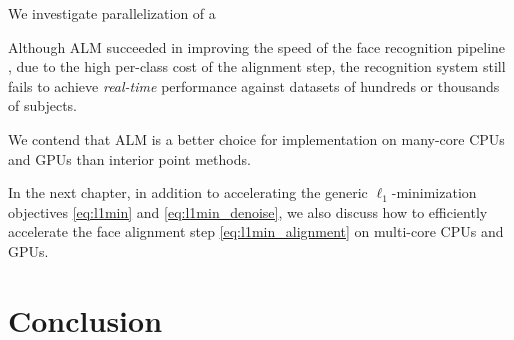 


We investigate parallelization of a



Although ALM succeeded in improving the speed of the face recognition pipeline
\cite{WagnerA2011-PAMI}, due to the high per-class cost of the alignment step,
the recognition system still fails to achieve \emph{real-time} performance
against datasets of hundreds or thousands of subjects.  

We contend that ALM is a better choice for implementation on many-core CPUs and
GPUs than interior point methods. 

In the next chapter,
in addition to accelerating the generic
$\ell_1$-minimization objectives \eqref{eq:l1min} and \eqref{eq:l1min_denoise}, we 
also discuss how to efficiently accelerate the face alignment step
\eqref{eq:l1min_alignment} on multi-core CPUs and GPUs.





%

%
%

\section{Conclusion}



